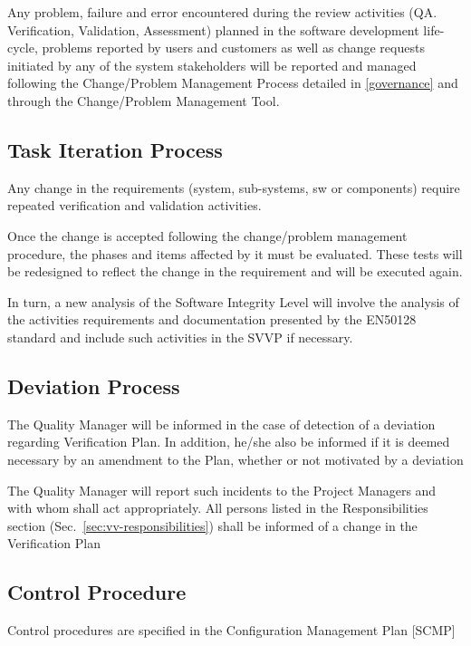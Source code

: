 Any problem, failure and error encountered during the review
activities (QA. Verification, Validation, Assessment) planned in the
software development life-cycle, problems reported by users and
customers as well as change requests initiated by any of the system
stakeholders will be reported and managed following the Change/Problem
Management Process detailed in
\href{https://github.com/openETCS/governance/tree/master/Change-Problem%20Process}{[governance]} and through the Change/Problem Management Tool.

\subsection{Task Iteration Process}
Any change in the requirements (system, sub-systems, sw or components)
require repeated verification and validation activities. 

Once the change is accepted following the change/problem management
procedure, the phases and items affected by it must be
evaluated. These tests will be redesigned to reflect the change in the
requirement and will be executed again. 

In turn, a new analysis of the Software Integrity Level will involve
the analysis of the activities requirements and documentation
presented by the EN50128 standard and include such activities in the
SVVP if necessary. 

\subsection{Deviation Process}
The Quality Manager will be informed in the case of detection of a
deviation regarding Verification Plan. In addition, he/she also be
informed if it is deemed necessary by an amendment to the Plan,
whether or not motivated by a deviation 

The Quality Manager will report such incidents to the Project Managers
and with whom shall act appropriately. All persons listed in the
Responsibilities section (Sec.~\ref{sec:vv-responsibilities}) shall be
informed of a change in the Verification Plan

\subsection{Control Procedure}
Control procedures are specified in the Configuration Management Plan [SCMP]
